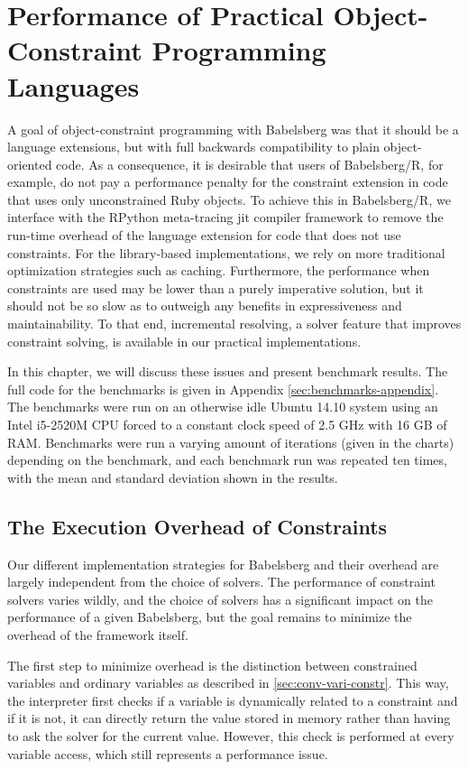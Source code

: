 \chapter{Performance of Practical Object-Constraint Programming Languages}
\label{sec:ruby-performance}
\label{cha:performance}

A goal of object-constraint programming with Babelsberg was that it should be a
language extensions, but with full backwards compatibility to plain
object-oriented code. As a consequence, it is desirable that users of
Babelsberg/R, for example, do not pay a performance penalty for the constraint extension in
code that uses only unconstrained Ruby objects.  To achieve this in
Babelsberg/R, we interface with the RPython meta-tracing \ac{jit} compiler
framework to remove the run-time overhead of the language extension for code that
does not use constraints. For the library-based implementations, we rely on more
traditional optimization strategies such as caching. Furthermore, the
performance when constraints are used may be lower than a purely imperative
solution, but it should not be so slow as to outweigh any benefits in
expressiveness and maintainability. To that end, incremental resolving, a solver
feature that improves constraint solving, is available in our practical
implementations.

In this chapter, we will discuss these issues and present benchmark results. The
full code for the benchmarks is given in Appendix \ref{sec:benchmarks-appendix}.
The benchmarks were run on an otherwise idle Ubuntu 14.10 system using an Intel
i5-2520M CPU forced to a constant clock speed of 2.5 GHz with 16 GB of
RAM. Benchmarks were run a varying amount of iterations (given in the charts)
depending on the benchmark, and each benchmark run was repeated ten times, with
the mean and standard deviation shown in the results.

\section{The Execution Overhead of Constraints}
Our different implementation strategies for Babelsberg and their overhead are
largely independent from the choice of solvers. The performance of constraint
solvers varies wildly, and the choice of solvers has a significant impact on the
performance of a given Babelsberg, but the goal remains to minimize the overhead
of the framework itself.

The first step to minimize overhead is the distinction between constrained
variables and ordinary variables as described in \autoref{sec:conv-vari-constr}.
This way, the interpreter first checks if a variable is dynamically related to a
constraint and if it is not, it can directly return the value stored in memory
rather than having to ask the solver for the current value.  However, this check
is performed at every variable access, which still represents a performance
issue.

